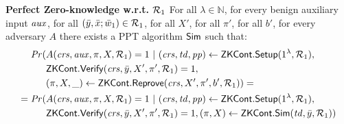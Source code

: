 \begin{definition}[ZK Continuations]
\noindent \textbf{Perfect Zero-knowledge w.r.t. $\mathcal{R}_1$} For all $\lambda \in \mathbb{N}$, for every benign auxiliary input $\mathit{aux}$, 
for all  $(\bar{y}, \bar{x}; \bar{w}_1) \in \mathcal{R}_1$, for all $X'$, for all $\pi'$, for all $b'$, for every adversary $A$ there exists a PPT algorithm $ {\mathsf{Sim}} $ such that:
\begin{align*}
\mathit{Pr}(& A(\mathit{crs}, \mathit{aux}, \pi, X, \mathcal{R}_1) = 1 \ | \ (\mathit{crs}, \mathit{td}, \mathit{pp}) \leftarrow {\ensuremath{\mathsf{ZKCont}}}.{\mathsf{Setup}} (1^{\lambda}, \mathcal{R}_1), \\
                  & {\mathsf{ZKCont}}.{\mathsf{Verify}}(\mathit{crs}, \bar{y}, X', \pi', \mathcal{R}_1) = 1, \\
                  & (\pi, X, \_) \leftarrow {\ensuremath{\mathsf{ZKCont}}}.{\mathsf{Reprove}} (\mathit{crs}, X', \pi', b', \mathcal{R}_1)) =  \\
= \mathit{Pr}(& A(\mathit{crs}, \mathit{aux}, \pi, X, \mathcal{R}_1) = 1 \ | \ (\mathit{crs}, \mathit{td}, \mathit{pp}) \leftarrow {\ensuremath{\mathsf{ZKCont}}}.{\mathsf{Setup}} (1^{\lambda}, \mathcal{R}_1), \\ 
                     & {\mathsf{ZKCont}}.{\mathsf{Verify}}(\mathit{crs}, \bar{y}, X', \pi', \mathcal{R}_1) = 1, (\pi, X) \leftarrow {\ensuremath{\mathsf{ZKCont}}}.{\mathsf{Sim}}(\mathit{td}, \bar{y}, \mathcal{R}_1))
\end{align*}

\begin{comment}
\begin{align*}
\mathit{Pr}(& A(\crs, \realaux, \pi', X', \relone) = 1 \ | \ (\crs, \pp) \leftarrow \ZKCont.\Setup (1^{\lambda}), \\
                  & (\crs, \crs) \leftarrow \ZKCont.\Gen(\crs, \relone), \\ 
                  & (\pi', X', \_) \leftarrow \ZKCont.\Reprove (\crs, X, \pi, b, \relone), \\
                  &  \ZKCont.\Verify(\crs, \bary, X, \pi, \relone) = 1) =  \\
= \mathit{Pr}(& A(\crs, \realaux, \pi', X', \relone) = 1 \ | \ (\crs, \pp) \leftarrow \ZKCont.\Setup (1^{\lambda}), \\ 
                     & (\crs, \crsvk) \leftarrow \ZKCont.\Gen(\crs, \relone), (\pi', X') \leftarrow \ZKCont.\Sim(\tw, \bary, \relone) \\ 
                     &  \ZKCont.\Verify(\crsvk, \bary, X, \pi, \relone) = 1)
\end{align*}
\end{comment}
 
\begin{comment} 
Maybe some remarks why we define ZK only for Reprove? Does it cover ZK for Preprove as well?
\end{comment}

\end{definition} 

